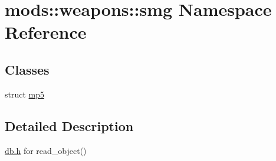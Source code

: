 \hypertarget{namespacemods_1_1weapons_1_1smg}{}\section{mods\+:\+:weapons\+:\+:smg Namespace Reference}
\label{namespacemods_1_1weapons_1_1smg}
\subsection*{Classes}
\begin{DoxyCompactItemize}
\item 
struct \hyperlink{structmods_1_1weapons_1_1smg_1_1mp5}{mp5}
\end{DoxyCompactItemize}


\subsection{Detailed Description}
\hyperlink{db_8h_source}{db.\+h} for read\+\_\+object() 